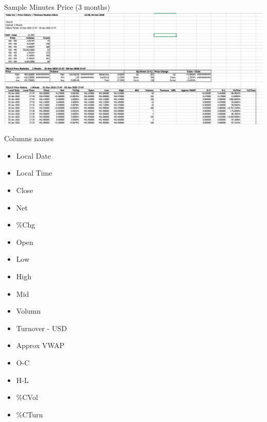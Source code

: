 \begin{enumerate}
{     \item Sample Minutes Price (3 months) \\
            \includegraphics[width=17cm]{Chapters/Chapter_2_Section/Tesla_3_month_data.png}

    }
    
    \item Columns names\\
      \begin{itemize}
         \item Local Date
         \item Local Time 
         \item Close 
         \item Net 
         \item \%Chg
         \item Open 
         \item Low 
         \item High 
         \item Mid 
         \item Volumn 
         \item Turnover - USD 
         \item Approx VWAP
         \item O-C
         \item H-L
         \item \%CVol
         \item \%CTurn
         
         
         
 
      \end{itemize}
    
    
    
\end{enumerate}